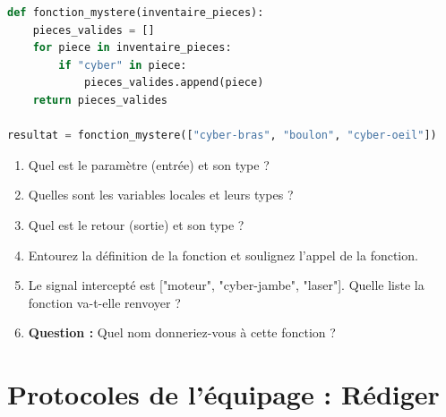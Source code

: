 \begin{Exercise}[title={Scanner de robots (Complexe) }]
\begin{lstlisting}[style=pythonstyle, language=python]
def fonction_mystere(inventaire_pieces):
    pieces_valides = []
    for piece in inventaire_pieces:
        if "cyber" in piece:
            pieces_valides.append(piece)
    return pieces_valides

resultat = fonction_mystere(["cyber-bras", "boulon", "cyber-oeil"])
\end{lstlisting}
\begin{enumerate}
    \item Quel est le paramètre (entrée) et son type ?
    \item Quelles sont les variables locales et leurs types ?
    \item Quel est le retour (sortie) et son type ?
    \item Entourez la définition de la fonction et soulignez l'appel de la fonction.
    \item Le signal intercepté est ["moteur", "cyber-jambe", "laser"]. Quelle liste la fonction va-t-elle renvoyer ?
    \item \textbf{Question :} Quel nom donneriez-vous à cette fonction ? 
\end{enumerate}
\end{Exercise}

\newpage
\section{Protocoles de l'équipage : Rédiger }

